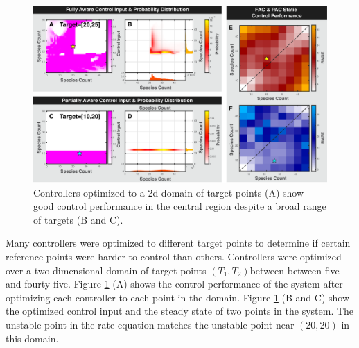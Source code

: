 \documentclass[12pt]{article}
\begin{document}
\begin{figure}
\begin{center}
\includegraphics[width=1\textwidth]{StaticControl.pdf}
\vspace{-0.1in}
\caption{Controllers optimized to a 2d domain of target points (A) show good control performance in the central region despite a broad range of targets (B and C). }
\label{CtrlP}
\end{center}
\vspace{-0.2in}
\end{figure}

Many controllers were optimized to different target points to determine if certain reference points were harder to control than others. Controllers were optimized over a two dimensional domain of target points $(T_1,T_2)$between between five and fourty-five. Figure \ref{CtrlP} (A) shows the control performance of the system after optimizing each controller to each point in the domain. Figure \ref{CtrlP} (B and C) show the optimized control input and the steady state of two points in the system. The unstable point in the rate equation matches the unstable point near $(20,20)$ in this domain.
\end{document}
